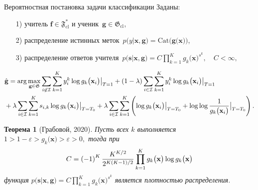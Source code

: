\documentclass[10pt,pdf,hyperref={unicode}]{beamer}
\newtheorem{rustheorem}{Теорема}
\begin{document}
\begin{frame}{Вероятностная постановка задачи классификации}
\justifying
Заданы:
\begin{enumerate}
	\item[1)] учитель $\mathbf{f}\in\mathfrak{F}_{\text{cl}}^{*}$ и ученик~$\mathbf{g}\in\mathfrak{G}_{\text{cl}}$,
	\item[2)] распределение истинных меток~$p\bigr(y|\mathbf{x}, \mathbf{g}\bigr) = \text{Cat}\bigr(\mathbf{g}\bigr(\mathbf{x}\bigr)\bigr)$,
	\item[3)] распределение ответов учителя~$p\bigr(\mathbf{s}|\mathbf{x}, \mathbf{g}\bigr) = C\prod_{k=1}^{K}g_k\bigr(\mathbf{x}\bigr)^{s^k}, \quad C < \infty,$
\end{enumerate}
\[
\setlength\abovedisplayskip{0pt}
\begin{aligned}
&\hat{\mathbf{g}} = \arg\max_{\mathbf{g}\in \mathfrak{G}} \sum_{i\not\in \mathcal{I}}\sum_{k=1}^{K}y_i^k\log g_k\bigr(\mathbf{x}_i\bigr)\bigr|_{T=1} 
+ \left(1-\lambda\right)\sum_{i\in \mathcal{I}}\sum_{k=1}^{K}y_i^k\log g_k\bigr(\mathbf{x}_i\bigr)\bigr|_{T=1} \\
&+ \lambda\sum_{i\in \mathcal{I}}\sum_{k=1}^{K}s_{i,k}\log g_k\bigr(\mathbf{x}_i\bigr)\bigr|_{T=T_0} 
+ \lambda \sum_{i\in \mathcal{I}}\sum_{k=1}^{K}\left(\log g_k\bigr(\mathbf{x}_i\bigr)\bigr|_{T=T_0} + \log\log\frac{1}{g_k\bigr(\mathbf{x}_i\bigr)}\bigr|_{T=T_0}\right).
\end{aligned}
\setlength\belowdisplayskip{0pt}
\]

\begin{rustheorem}[Грабовой, 2020]
\label{theorem:st:dist}
Пусть всех $k$ выполняется $1 > 1- \varepsilon > g_k\bigr(\mathbf{x}\bigr) > \varepsilon > 0,$ тогда при
\[
\setlength\abovedisplayskip{0pt}
C=\left(-1\right)^{K}\frac{K^{K/2}}{2^{K(K-1)/2}}\prod_{k=1}^{K}g_k\bigr(\mathbf{x}\bigr)\log g_k\bigr(\mathbf{x}\bigr)
\setlength\belowdisplayskip{0pt}
\]
функция $p\bigr(\mathbf{s}|\mathbf{x}, \mathbf{g}\bigr) = C\prod_{k=1}^{K}g_k\bigr(\mathbf{x}\bigr)^{s^k}$ является плотностью распределения.
\end{rustheorem}

\end{frame}
\end{document}
